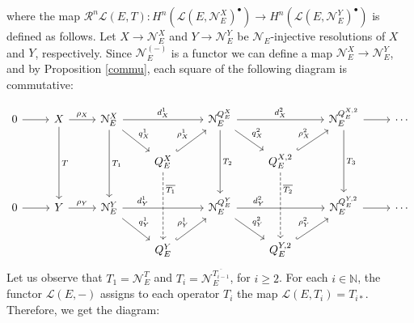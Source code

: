 \documentclass[12pt,a4paper]{amsproc}
\theoremstyle{remark}
\theoremstyle{definition}
\newcommand{\cL}{\mathcal{L}}
\numberwithin{equation}{section}
\begin{document}
where the map $\mathcal{R}^n \cL(E, T): H^n(\cL(E, \mathcal{N}_E^X)^{\bullet})\longrightarrow H^n(\cL(E, \mathcal{N}_E^Y)^{\bullet})$ is defined as follows. Let $X \to \mathcal{N}_E^X$ and $Y \to \mathcal{N}_E^Y$ be $\mathcal{N}_E$-injective resolutions of $X$ and $Y$, respectively. Since $\mathcal{N}_E^{(-)}$ is a functor we can define a map $\mathcal{N}_E^X \to \mathcal{N}_E^Y$, and by Proposition \ref{commu}, each square of the following diagram is commutative:

\begin{equation}\label{prev}
	\begin{tikzcd}
		0 \arrow[r] & X \arrow[r, "\rho_X"] \arrow[dd, "T"] & \mathcal{N}_E^X \arrow[rd, "q_X^1"] \arrow[rr, "d^1_X"] \arrow[dd, "T_1"] &                                                                                & \mathcal{N}_E^{Q_E^X} \arrow[rd, "q^2_X"] \arrow[rr, "d^2_X"] \arrow[dd, "T_2"] &                                                                                & \mathcal{N}_E^{Q_E^{X,2}} \arrow[r] \arrow[dd, "T_3"] & \cdots \\
		&                                       &                                                                            & Q_E^X \arrow[ru, "\rho^1_X", hook] \arrow[dd, "\overline{T_1}", near start, dashed] &                                                                                       & Q_E^{X,2} \arrow[ru, "\rho^2_X", hook] \arrow[dd, "\overline{T_2}", dashed, near start] &                                                         &        \\
		0 \arrow[r] & Y \arrow[r, "\rho_Y"]                 & \mathcal{N}_E^Y \arrow[rd, "q^1_Y"] \arrow[rr, "d^1_Y", near start]                   &                                                                                & \mathcal{N}_E^{Q_E^Y} \arrow[rd, "q^2_Y"] \arrow[rr, "d^2_Y", near start]                   &                                                                                & \mathcal{N}_E^{Q_E^{Y,2}} \arrow[r]                   & \cdots \\
		&                                       &                                                                            & Q_E^Y \arrow[ru, "\rho^{1}_Y", hook]                                    &                                                                                       & Q_E^{Y,2} \arrow[ru, "\rho^2_Y", hook]                                      &                                                         &       
	\end{tikzcd}
\end{equation}
Let us observe that $T_1=\mathcal{N}_E^{T}$ and $T_i=\mathcal{N}_E^{\overline{T_{i-1}}}$, for $i\geq 2$.
For each $i \in \mathbb{N}$, the functor $\cL(E,-)$ assigns  to each operator $T_i$ the map $\cL(E,T_i)=T_{i*}$. Therefore, we get the diagram:
\end{document}
